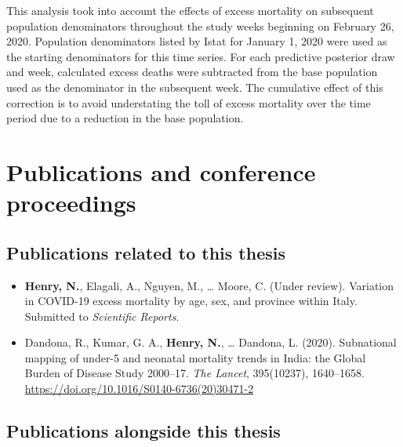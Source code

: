 \documentclass[
]{report}
\begin{document}
This analysis took into account the effects of excess mortality on subsequent population denominators throughout the study weeks beginning on February 26, 2020. Population denominators listed by Istat for January 1, 2020 were used as the starting denominators for this time series. For each predictive posterior draw and week, calculated excess deaths were subtracted from the base population used as the denominator in the subsequent week. The cumulative effect of this correction is to avoid understating the toll of excess mortality over the time period due to a reduction in the base population.

\hypertarget{publications-and-conference-proceedings}{%
\chapter{Publications and conference proceedings}\label{publications-and-conference-proceedings}}

\hypertarget{publications-related-to-this-thesis}{%
\section*{Publications related to this thesis}\label{publications-related-to-this-thesis}}

\begin{itemize}
\item
  \textbf{Henry, N.}, Elagali, A., Nguyen, M., \ldots{} Moore, C. (Under review). Variation in COVID-19 excess mortality by age, sex, and province within Italy. Submitted to \emph{Scientific Reports}.
\item
  Dandona, R., Kumar, G. A., \textbf{Henry, N.}, \ldots{} Dandona, L. (2020). Subnational mapping of under-5 and neonatal mortality trends in India: the Global Burden of Disease Study 2000--17. \emph{The Lancet}, 395(10237), 1640--1658. \url{https://doi.org/10.1016/S0140-6736(20)30471-2}
\end{itemize}

\hypertarget{publications-alongside-this-thesis}{%
\section*{Publications alongside this thesis}\label{publications-alongside-this-thesis}}
\end{document}
